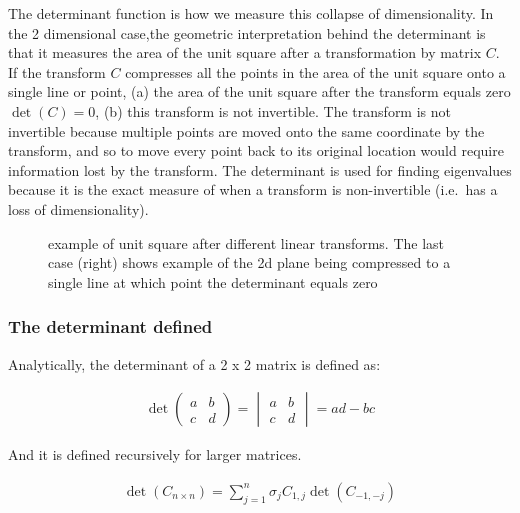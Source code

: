 \documentclass[
  letterpaper,
  DIV=11,
  numbers=noendperiod]{scrartcl}
\begin{document}
The determinant function is how we measure this collapse of
dimensionality. In the 2 dimensional case,the geometric interpretation
behind the determinant is that it measures the area of the unit square
after a transformation by matrix \(C\). If the transform \(C\)
compresses all the points in the area of the unit square onto a single
line or point, (a) the area of the unit square after the transform
equals zero \(\det(C)=0\), (b) this transform is not invertible. The
transform is not invertible because multiple points are moved onto the
same coordinate by the transform, and so to move every point back to its
original location would require information lost by the transform. The
determinant is used for finding eigenvalues because it is the exact
measure of when a transform is non-invertible (i.e.~has a loss of
dimensionality).

\begin{figure}

{\centering 

}

\caption{\label{fig-2d-determinant}example of unit square after
different linear transforms. The last case (right) shows example of the
2d plane being compressed to a single line at which point the
determinant equals zero}

\end{figure}

\hypertarget{the-determinant-defined}{%
\subsubsection{The determinant defined}\label{the-determinant-defined}}

Analytically, the determinant of a 2 x 2 matrix is defined as:

\begin{align*}
\det{\begin{pmatrix} a & b \\ c & d \end{pmatrix}} = \begin{vmatrix} a & b \\ c & d \end{vmatrix} = ad - bc
\end{align*}

And it is defined recursively for larger matrices.

\begin{align*}
\det(C_{n\times n}) = \sum_{j=1}^n \sigma_j C_{1,j} \det(C_{-1, -j})
\end{align*}
\end{document}

